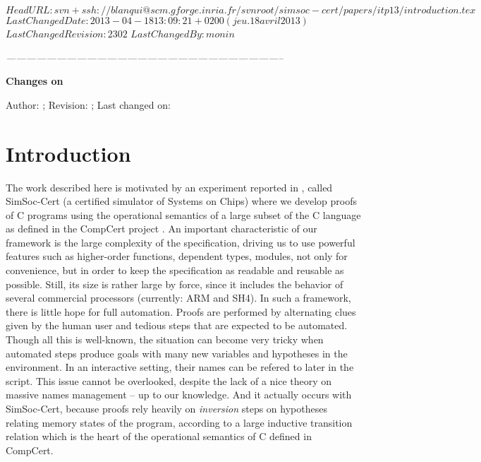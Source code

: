 \svnidlong
{$HeadURL: svn+ssh://blanqui@scm.gforge.inria.fr/svnroot/simsoc-cert/papers/itp13/introduction.tex $}
{$LastChangedDate: 2013-04-18 13:09:21 +0200 (jeu. 18 avril 2013) $}
{$LastChangedRevision: 2302 $}
{$LastChangedBy: monin $}


\begin{thoughts}
\itshape
\hfil -----------------------------------------------------------------------------------\par
\hfil \textbf{Changes on \currfilename}

Author: \svnfileauthor; Revision: \svnfilerev; Last changed on: \svnfiledate
\end{thoughts}


\section{Introduction}
\label{sec:intro}


The work described here is motivated by an experiment reported in \cite{rapido11,cpp11},
called SimSoc-Cert (a certified simulator of Systems on Chips)
where we develop proofs of C programs using the operational semantics of
a large subset of the C language as defined in the CompCert %
project \cite{Leroy-Compcert-CACM}.
An important characteristic of our framework is 
the large complexity of the specification,
driving us to use powerful features such as higher-order functions,
dependent types, modules,
not only for convenience, 
but in order to keep the specification as readable and reusable as possible.
Still, its size is rather large by force, since it includes the behavior of 
several commercial processors (currently: ARM and SH4).
In such a framework, 
there is little hope for full automation.
Proofs are performed by alternating clues given by the human user 
and tedious steps that are expected to be automated.
Though all this is well-known, 
the situation can become very tricky when automated steps 
produce goals with many new variables and hypotheses in the environment. 
In an interactive setting, their names can be refered to later
in the script.
This issue cannot be overlooked,
despite the lack of a nice theory on massive names management
-- up to our knowledge.
And it actually occurs with SimSoc-Cert,
because proofs rely heavily on \emph{inversion} steps on 
hypotheses relating memory states of the program,
according to a large inductive transition relation 
which is the heart of the operational semantics of C defined in CompCert.


